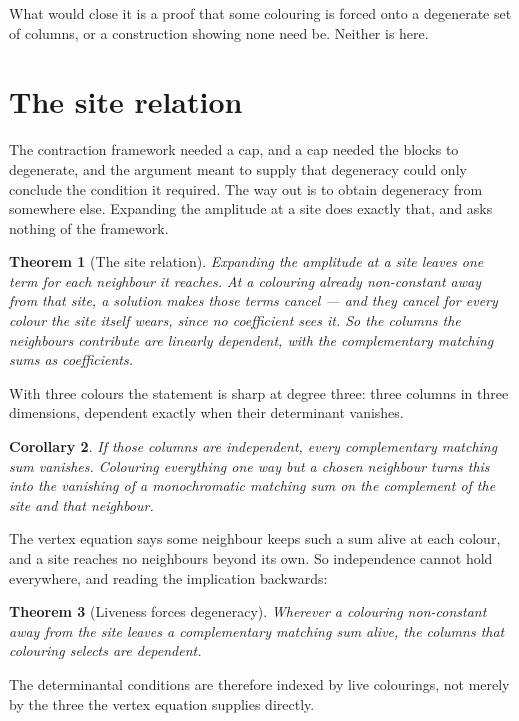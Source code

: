 \documentclass[11pt]{article}
\newtheorem{theorem}{Theorem}[section]
\newtheorem{corollary}[theorem]{Corollary}
\theoremstyle{definition}
\theoremstyle{remark}
\begin{document}
What would close it is a proof that some colouring is forced onto a degenerate set of
columns, or a construction showing none need be. Neither is here.

\section{The site relation}\label{sec:site}

The contraction framework needed a cap, and a cap needed the blocks to degenerate, and
the argument meant to supply that degeneracy could only conclude the condition it
required. The way out is to obtain degeneracy from somewhere else. Expanding the
amplitude at a site does exactly that, and asks nothing of the framework.

\begin{theorem}[The site relation]
Expanding the amplitude at a site leaves one term for each neighbour it reaches. At a
colouring already non-constant away from that site, a solution makes those terms cancel
--- and they cancel for every colour the site itself wears, since no coefficient sees it.
So the columns the neighbours contribute are linearly dependent, with the complementary
matching sums as coefficients.
\end{theorem}

With three colours the statement is sharp at degree three: three columns in three
dimensions, dependent exactly when their determinant vanishes.

\begin{corollary}
If those columns are independent, every complementary matching sum vanishes. Colouring
everything one way but a chosen neighbour turns this into the vanishing of a
\emph{monochromatic} matching sum on the complement of the site and that neighbour.
\end{corollary}

The vertex equation says some neighbour keeps such a sum alive at each colour, and a site
reaches no neighbours beyond its own. So independence cannot hold everywhere, and reading
the implication backwards:

\begin{theorem}[Liveness forces degeneracy]
Wherever a colouring non-constant away from the site leaves a complementary matching sum
alive, the columns that colouring selects are dependent.
\end{theorem}

The determinantal conditions are therefore indexed by live colourings, not merely by the
three the vertex equation supplies directly.
\end{document}
